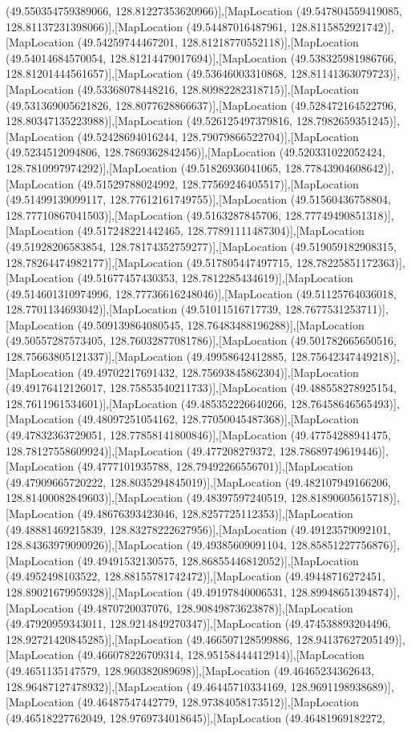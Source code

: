(49.550354759389066, 128.81227353620966)],[MapLocation (49.547804559419085, 128.81137231398066)],[MapLocation (49.54487016487961, 128.8115852921742)],[MapLocation (49.54259744467201, 128.81218770552118)],[MapLocation (49.54014684570054, 128.81214479017694)],[MapLocation (49.538325981986766, 128.81201444561657)],[MapLocation (49.53646003310868, 128.81141363079723)],[MapLocation (49.53368078448216, 128.80982282318715)],[MapLocation (49.531369005621826, 128.8077628866637)],[MapLocation (49.528472164522796, 128.80347135223988)],[MapLocation (49.526125497379816, 128.7982659351245)],[MapLocation (49.52428694016244, 128.79079866522704)],[MapLocation (49.5234512094806, 128.7869362842456)],[MapLocation (49.520331022052424, 128.7810997974292)],[MapLocation (49.51826936041065, 128.77843904608642)],[MapLocation (49.51529788024992, 128.77569246405517)],[MapLocation (49.51499139099117, 128.77612161749755)],[MapLocation (49.51560436758804, 128.77710867041503)],[MapLocation (49.5163287845706, 128.77749490851318)],[MapLocation (49.517248221442465, 128.77891111487304)],[MapLocation (49.51928206583854, 128.78174352759277)],[MapLocation (49.519059182908315, 128.78264474982177)],[MapLocation (49.517805447497715, 128.78225851172363)],[MapLocation (49.51677457430353, 128.7812285434619)],[MapLocation (49.514601310974996, 128.77736616248046)],[MapLocation (49.51125764036018, 128.7701134693042)],[MapLocation (49.51011516717739, 128.7677531253711)],[MapLocation (49.509139864080545, 128.76483488196288)],[MapLocation (49.50557287573405, 128.76032877081786)],[MapLocation (49.501782665650516, 128.75663805121337)],[MapLocation (49.49958642412885, 128.75642347449218)],[MapLocation (49.49702217691432, 128.75693845862304)],[MapLocation (49.49176412126017, 128.75853540211733)],[MapLocation (49.488558278925154, 128.7611961534601)],[MapLocation (49.485352226640266, 128.76458646565493)],[MapLocation (49.48097251054162, 128.77050045487368)],[MapLocation (49.47832363729051, 128.77858141800846)],[MapLocation (49.47754288941475, 128.78127558609924)],[MapLocation (49.477208279372, 128.78689749619446)],[MapLocation (49.4777101935788, 128.79492266556701)],[MapLocation (49.47909665720222, 128.8035294845019)],[MapLocation (49.482107949166206, 128.81400082849603)],[MapLocation (49.48397597240519, 128.81890605615718)],[MapLocation (49.48676393423046, 128.8257725112353)],[MapLocation (49.48881469215839, 128.83278222627956)],[MapLocation (49.49123579092101, 128.84363979090926)],[MapLocation (49.49385609091104, 128.85851227756876)],[MapLocation (49.49491532130575, 128.86855446812052)],[MapLocation (49.4952498103522, 128.88155781742472)],[MapLocation (49.49448716272451, 128.89021679959328)],[MapLocation (49.49197840006531, 128.89948651394874)],[MapLocation (49.4870720037076, 128.90849873623878)],[MapLocation (49.47920959343011, 128.9214849270347)],[MapLocation (49.474538893204496, 128.92721420845285)],[MapLocation (49.466507128599886, 128.94137627205149)],[MapLocation (49.466078226709314, 128.95158444412914)],[MapLocation (49.4651135147579, 128.960382089698)],[MapLocation (49.46465234362643, 128.96487127478932)],[MapLocation (49.46445710334169, 128.9691198938689)],[MapLocation (49.46487547442779, 128.97384058173512)],[MapLocation (49.46518227762049, 128.9769734018645)],[MapLocation (49.46481969182272, 